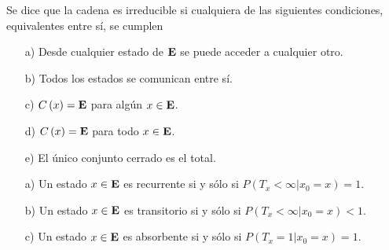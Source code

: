 \begin{Def}
Se dice que la cadena es irreducible si cualquiera de las siguientes condiciones, equivalentes entre sí,  se cumplen
\begin{enumerate}
\item[a) ] Desde cualquier estado de $\mathbf{E}$ se puede acceder a cualquier otro.

\item[b) ] Todos los estados se comunican entre sí.

\item[c) ] $C\left(x\right)=\mathbf{E}$ para algún $x\in\mathbf{E}$.

\item[d) ] $C\left(x\right)=\mathbf{E}$ para todo $x\in\mathbf{E}$.

\item[e) ] El único conjunto cerrado es el total.
\end{enumerate}
\end{Def}

\begin{Prop}
\begin{enumerate}
\item[a) ] Un estado $x\in\mathbf{E}$ es recurrente si y sólo si $P\left(T_{x}<\infty|x_{0}=x\right)=1$.

\item[b) ] Un estado $x\in\mathbf{E}$ es transitorio si y sólo si $P\left(T_{x}<\infty|x_{0}=x\right)<1$.

\item[c) ] Un estado $x\in\mathbf{E}$ es absorbente si y sólo si $P\left(T_{x}=1|x_{0}=x\right)=1$.


\end{enumerate}
\end{Prop}


